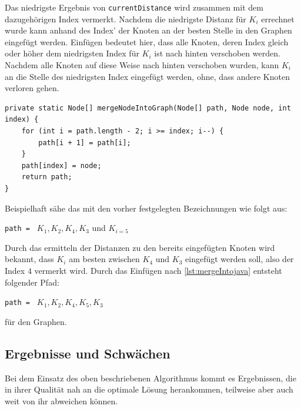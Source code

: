 Das niedrigste Ergebnis von \lstinline{currentDistance} wird zusammen mit dem dazugehörigen Index vermerkt. Nachdem die niedrigste Distanz für $K_i$ errechnet wurde kann anhand des Index' der Knoten an der besten Stelle in den Graphen eingefügt werden. 
Einfügen bedeutet hier, dass alle Knoten, deren Index gleich oder höher dem niedrigsten Index für $K_i$ ist nach hinten verschoben werden. Nachdem alle Knoten auf diese Weise nach hinten verschoben wurden, kann $K_i$ an die Stelle des niedrigsten Index eingefügt werden, ohne, dass andere Knoten verloren gehen.
\begin{lstlisting}[caption={Einfügen von Knoten in einen bestehenden Graph}, label={lst:mergeIntojava}]
private static Node[] mergeNodeIntoGraph(Node[] path, Node node, int index) {
    for (int i = path.length - 2; i >= index; i--) {
        path[i + 1] = path[i];
    }
    path[index] = node;
    return path;
}
\end{lstlisting}
Beispielhaft sähe das mit den vorher festgelegten Bezeichnungen wie folgt aus: 
\begin{addmargin}[1em]{2em}
\lstinline{path = } $K_1, K_2, K_4, K_3$ und $K_{i = 5}$ 
\end{addmargin}
Durch das ermitteln der Distanzen zu den bereits eingefügten Knoten wird bekannt, dass $K_i$ am besten zwischen $K_4$ und $K_3$ eingefügt werden soll, also der Index $4$ vermerkt wird. Durch das Einfügen nach \vref{lst:mergeIntojava} entsteht folgender Pfad:
\begin{addmargin}[1em]{2em}
\lstinline{path = } $K_1, K_2, K_4, K_5, K_3$
\end{addmargin}
für den Graphen.

\subsection{Ergebnisse und Schwächen}
Bei dem Einsatz des oben beschriebenen Algorithmus kommt es Ergebnissen, die in ihrer Qualität nah an die optimale Lösung herankommen, teilweise aber auch weit von ihr abweichen können.

    

